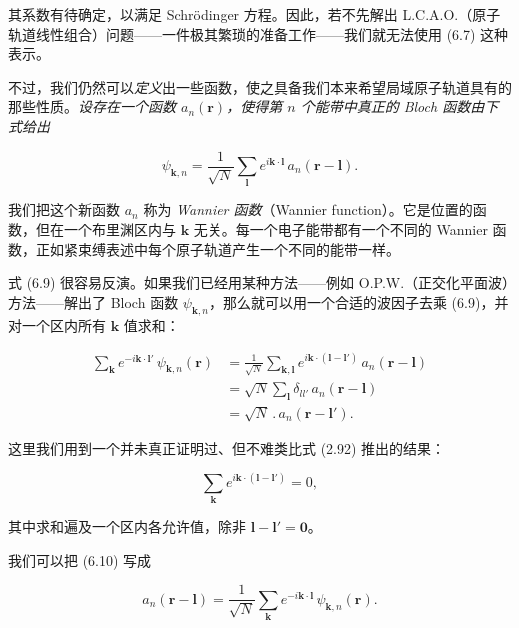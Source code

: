 其系数有待确定，以满足 Schrödinger 方程。因此，若不先解出 L.C.A.O.（原子轨道线性组合）问题——一件极其繁琐的准备工作——我们就无法使用 (6.7) 这种表示。

不过，我们仍然可以\emph{定义}出一些函数，使之具备我们本来希望局域原子轨道具有的那些性质。\emph{设存在一个函数 $a_n(\mathbf{r})$，使得第 $n$ 个能带中真正的 Bloch 函数由下式给出}

\begin{equation*}
\psi_{\mathbf{k},n} = \frac{1}{\sqrt{N}}\sum_{\boldsymbol{l}} e^{i\mathbf{k}\cdot\boldsymbol{l}}\,a_n(\mathbf{r}-\boldsymbol{l}).
\tag{6.9}
\end{equation*}

我们把这个新函数 $a_n$ 称为 \emph{Wannier 函数}（Wannier function）。它是位置的函数，但在一个布里渊区内与 $\mathbf{k}$ 无关。每一个电子能带都有一个不同的 Wannier 函数，正如紧束缚表述中每个原子轨道产生一个不同的能带一样。

式 (6.9) 很容易反演。如果我们已经用某种方法——例如 O.P.W.（正交化平面波）方法——解出了 Bloch 函数 $\psi_{\mathbf{k},n}$，那么就可以用一个合适的波因子去乘 (6.9)，并对一个区内所有 $\mathbf{k}$ 值求和：

\begin{align*}
\sum_{\mathbf{k}} e^{-i\mathbf{k}\cdot\boldsymbol{l}'}\,\psi_{\mathbf{k},n}(\mathbf{r}) &= \frac{1}{\sqrt{N}}\sum_{\mathbf{k},\boldsymbol{l}} e^{i\mathbf{k}\cdot(\boldsymbol{l}-\boldsymbol{l}')}\,a_n(\mathbf{r}-\boldsymbol{l}) \\
&= \sqrt{N}\sum_{\boldsymbol{l}} \delta_{ll'}\,a_n(\mathbf{r}-\boldsymbol{l}) \\
&= \sqrt{N}\,.\,a_n(\mathbf{r}-\boldsymbol{l}'). \tag{6.10}
\end{align*}

这里我们用到一个并未真正证明过、但不难类比式 (2.92) 推出的结果：

\begin{equation*}
\sum_{\mathbf{k}} e^{i\mathbf{k}\cdot(\boldsymbol{l}-\boldsymbol{l}')} = 0,
\tag{6.11}
\end{equation*}

其中求和遍及一个区内各允许值，除非 $\boldsymbol{l}-\boldsymbol{l}'=\mathbf{0}$。

我们可以把 (6.10) 写成

\begin{equation*}
a_n(\mathbf{r}-\boldsymbol{l}) = \frac{1}{\sqrt{N}}\sum_{\mathbf{k}} e^{-i\mathbf{k}\cdot\boldsymbol{l}}\,\psi_{\mathbf{k},n}(\mathbf{r}).
\tag{6.12}
\end{equation*}

